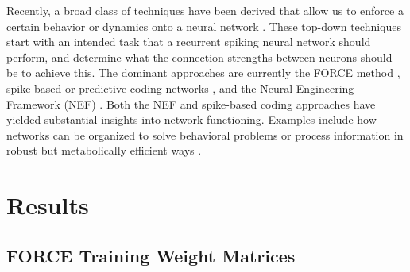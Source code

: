\documentclass[11pt]{article} %
\begin{document}
Recently, a broad class of techniques have been derived that allow us to enforce a certain behavior or 
dynamics onto a neural network \cite{FORCE1,FORCE2,FORCE3,FORCE4,Deneve1,Deneve2,Deneve4,Chris1,Chris2,Gilra}.  
These top-down techniques start with an intended task that a recurrent spiking neural network should perform, 
and determine what the connection strengths between neurons should be to achieve this.   
The dominant approaches are currently the FORCE method \cite{FORCE1,FORCE2},  spike-based or 
predictive coding networks \cite{Deneve1,Deneve2,Deneve4}, and the 
Neural Engineering Framework (NEF) \cite{Chris1,Chris2}.  Both the NEF and spike-based coding approaches 
have yielded substantial insights into network functioning.  
Examples include how networks can be organized to solve behavioral problems \cite{Chris1} 
or process information in robust but metabolically efficient ways \cite{Deneve1,Deneve2}.  


\section*{Results} 

\subsection*{FORCE Training Weight Matrices} 
\end{document}

